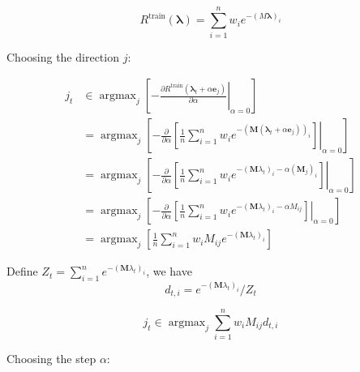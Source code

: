 \documentclass{article}
\begin{document}
\subsection{}
\begin{equation}R^{\operatorname{train}}(\boldsymbol{\lambda})=\sum_{i=1}^{n} w_{i} e^{-(M \boldsymbol{\lambda})_{i}}\end{equation}

Choosing the direction $j$:

\begin{equation}\begin{aligned}
j_{t} & \in \operatorname{argmax}_{j}\left[-\left.\frac{\partial R^{\operatorname{train}}\left(\boldsymbol{\lambda}_{t}+\alpha \mathbf{e}_{j}\right)}{\partial \alpha}\right|_{\alpha=0}\right] \\
&=\operatorname{argmax}_{j}\left[-\left.\frac{\partial}{\partial \alpha}\left[\frac{1}{n} \sum_{i=1}^{n} w_{i}e^{-\left(\mathbf{M}\left(\boldsymbol{\lambda}_{t}+\alpha \mathbf{e}_{j}\right)\right)_{i}}\right]\right|_{\alpha=0}\right] \\
&=\operatorname{argmax}_{j}\left[-\left.\frac{\partial}{\partial \alpha}\left[\frac{1}{n} \sum_{i=1}^{n} w_{i}e^{-\left(\mathbf{M} \lambda_{t}\right)_{i}-\alpha\left(\mathbf{M}_{j}\right)_{i}}\right]\right|_{\alpha=0}\right] \\
&=\operatorname{argmax}_{j}\left[-\left.\frac{\partial}{\partial \alpha}\left[\frac{1}{n} \sum_{i=1}^{n} w_{i}e^{-\left(\mathbf{M} \lambda_{t}\right)_{i}-\alpha M_{i j}}\right]\right|_{\alpha=0}\right] \\
&=\operatorname{argmax}_{j}\left[\frac{1}{n} \sum_{i=1}^{n} w_{i}M_{i j} e^{-\left(\mathbf{M} \lambda_{t}\right)_{i}}\right]
\end{aligned}\end{equation}

Define $Z_{t}=\sum_{i=1}^{n} e^{-\left(\mathbf{M} \lambda_{t}\right)_{i}}$, we have
\begin{equation}d_{t, i}=e^{-\left(\mathbf{M} \lambda_{t}\right)_{i}} / Z_{t}\end{equation}

\begin{equation}j_{t} \in \operatorname{argmax}_{j} \sum_{i=1}^{n} w_{i} M_{i j} d_{t, i}\end{equation}

Choosing the step $\alpha$:
\end{document}
